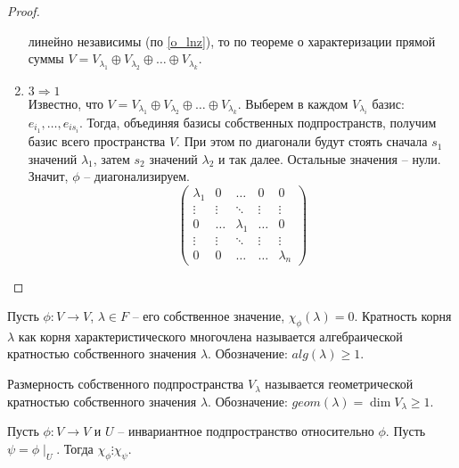 \begin{proof}
\begin{enumerate}
        линейно независимы (по \ref{o_lnz}), то по теореме о характеризации прямой суммы 
        $V = V_{\lambda_1} \oplus V_{\lambda_2} \oplus \dots \oplus V_{\lambda_k}$.
        \item $3 \Rightarrow 1$ \\
        Известно, что $V = V_{\lambda_1} \oplus V_{\lambda_2} \oplus \dots \oplus V_{\lambda_k}$. 
        Выберем в каждом $V_{\lambda_i}$ базис: $e_{i_1}, \dots, e_{is_i}$. Тогда, объединяя базисы 
        собственных подпространств, получим базис всего пространства $V$. 
        При этом по диагонали будут стоять сначала $s_1$ значений $\lambda_1$, 
        затем $s_2$ значений $\lambda_2$ и так далее. Остальные значения -- нули. 
        Значит, $\phi$ -- диагонализируем.
        \begin{equation*}
        \left(
            \begin{array}{ccccc}
            \lambda_{1} & 0 & \ldots & 0 & 0\\
            \vdots & \vdots & \ddots & \vdots & \vdots\\
            0 & \ldots & \lambda_{1} & \ldots & 0\\
            \vdots & \vdots & \ddots & \vdots & \vdots\\
            0 & 0 & \ldots & \ldots & \lambda_n
            \end{array}
        \right)
        \end{equation*}
    \end{enumerate}
\end{proof}

\begin{definition}
    Пусть $\phi: V \to V$, $\lambda \in F$ -- его собственное значение, $\chi_{\phi}(\lambda) = 0$.
    Кратность корня $\lambda$ как корня характеристического многочлена называется алгебраической 
    кратностью собственного значения $\lambda$. Обозначение: $alg(\lambda) \geq 1$.
\end{definition}

\begin{definition}
    Размерность собственного подпространства $V_{\lambda}$ называется геометрической кратностью 
    собственного значения $\lambda$. Обозначение: $geom(\lambda) = \dim V_{\lambda} \geq 1$.
\end{definition}

\begin{proposition}
    \label{pr4.1}
    Пусть $\phi: V \to V$ и $U$ -- инвариантное подпространство относительно $\phi$. 
    Пусть $\psi = \phi \mid_{U}$. Тогда $\chi_{\phi} \vdots \chi_{\psi}$.
\end{proposition}

